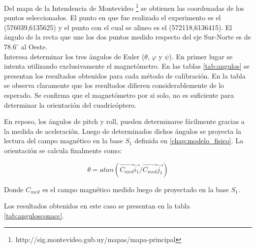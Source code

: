 \documentclass[main]{subfiles}
\begin{document}
Del mapa de la Intendencia de Montevideo \footnote{http://sig.montevideo.gub.uy/mapas/mapa-principal} se obtienen las coordenadas de los puntos seleccionados. El punto en que fue realizado el experimento es el (576039,6135625) y el punto con el cual se alineo es el (572118,6136415). El ángulo de la recta que une los dos puntos medido respecto del eje Sur-Norte es de $78.6^\circ$ al Oeste.\\

Interesa determinar los tres \'angulos de Euler ($\theta$, $\varphi$ y $\psi$). En primer lugar se intenta utilizando exclusivamente el magnet\'ometro. En las tablas \ref{tab:angulos} se presentan los resultados obtenidos para cada m\'etodo de calibraci\'on. En la tabla se observa claramente que los resultados difieren considerablemente de lo esperado. Se confirma que el magnet\'ometro por si solo, no es suficiente para determinar la orientaci\'on del cuadric\'optero. 

En reposo, los \'angulos de pitch y roll, pueden determinarse f\'acilmente gracias a la medida de aceleraci\'on. Luego de determinados dichos \'angulos se proyecta la lectura del campo magn\'etico en la base $S_1$ definida en \ref{chap:modelo_fisico}. La orientaci\'on se calcula finalmente como:

$$
\theta=atan(\vec{C_{med}}\vec{i_1}/\vec{C_{med}}\vec{j_1})
$$

Donde $C_{med}$ es el campo magn\'etico medido luego de proyectado en la base $S_1$. 

Los resultados obtenidos en este caso se presentan en la tabla \ref{tab:angulosconacc}.\\
\end{document}

